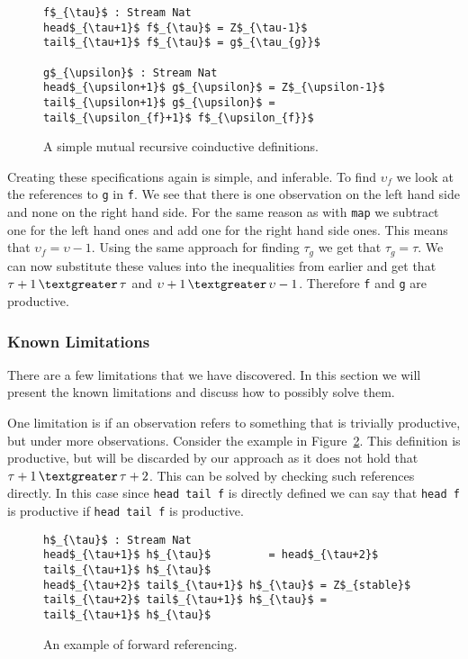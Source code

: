 \begin{figure}
\begin{Verbatim}[commandchars=\\\{\},codes={\catcode`$=3\catcode`_=8}]
f$_{\tau}$ : Stream Nat
head$_{\tau+1}$ f$_{\tau}$ = Z$_{\tau-1}$
tail$_{\tau+1}$ f$_{\tau}$ = g$_{\tau_{g}}$

g$_{\upsilon}$ : Stream Nat
head$_{\upsilon+1}$ g$_{\upsilon}$ = Z$_{\upsilon-1}$
tail$_{\upsilon+1}$ g$_{\upsilon}$ = tail$_{\upsilon_{f}+1}$ f$_{\upsilon_{f}}$
\end{Verbatim}
\caption{A simple mutual recursive coinductive definitions.}
\label{fig:mutRec1}
\end{figure}

Creating these specifications again is simple, and inferable. To find $\upsilon_{f}$ we look at the references to \texttt{g} in \texttt{f}. We see that there is one observation on the left hand side and none on the right hand side. For the same reason as with \texttt{map} we subtract one for the left hand ones and add one for the right hand side ones. This means that $\upsilon_{f} = \upsilon - 1$. Using the same approach for finding $\tau_{g}$ we get that $\tau_{g} = \tau$. We can now substitute these values into the inequalities from earlier and get that $\tau+1\,\textgreater\,\tau$ and $\upsilon+1\,\textgreater\,\upsilon - 1$. Therefore \texttt{f} and \texttt{g} are productive.

\subsubsection{Known Limitations}
There are a few limitations that we have discovered. In this section we will present the known limitations and discuss how to possibly solve them.

One limitation is if an observation refers to something that is trivially productive, but under more observations. Consider the example in Figure~\ref{fig:forwardRef}. This definition is productive, but will be discarded by our approach as it does not hold that $\tau+1\,\textgreater\,\tau+2$. This can be solved by checking such references directly. In this case since \texttt{head tail f} is directly defined we can say that \texttt{head f} is productive if \texttt{head tail f} is productive.

\begin{figure}
\begin{Verbatim}[commandchars=\\\{\},codes={\catcode`$=3\catcode`_=8}]
h$_{\tau}$ : Stream Nat
head$_{\tau+1}$ h$_{\tau}$         = head$_{\tau+2}$ tail$_{\tau+1}$ h$_{\tau}$
head$_{\tau+2}$ tail$_{\tau+1}$ h$_{\tau}$ = Z$_{stable}$
tail$_{\tau+2}$ tail$_{\tau+1}$ h$_{\tau}$ = tail$_{\tau+1}$ h$_{\tau}$
\end{Verbatim}
\caption{An example of forward referencing.}
\label{fig:forwardRef}
\end{figure}

